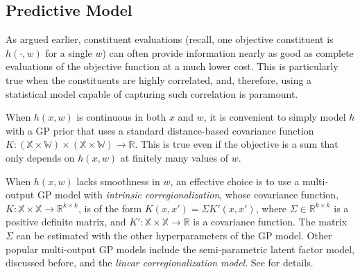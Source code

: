 \documentclass{wscpaperproc}
\newcommand{\R}{\mathbb{R}}
\newcommand{\X}{\mathbb{X}}
\newcommand{\W}{\mathbb{W}}
\theoremstyle{wsc}
\begin{document}

\subsection{Predictive Model}
As argued earlier,  constituent evaluations  (recall, one objective constituent is $h(\cdot,w)$ for a single $w$) can often provide information nearly as good as complete evaluations of the objective function at a much lower cost. This is particularly true when the constituents are highly correlated, and, therefore, using a statistical model capable of capturing such correlation is paramount.

When $h(x,w)$ is continuous in both $x$ and $w$, 
it is convenient to simply model $h$ with  
a GP prior that uses a standard distance-based covariance function $K:(\X\times\W)\times(\X\times\W)\rightarrow\R$. 
This is true even if the objective is a sum that only depends on $h(x,w)$ at finitely many values of $w$.



When $h(x,w)$ lacks smoothness in $w$,  
an effective choice is to use a multi-output GP model with \textit{intrinsic corregionalization}, whose covariance function, $K:\X\times\X \rightarrow \R^{k\times k}$, is of the form $K(x,x') = \Sigma K'(x,x')$, where $\Sigma\in\R^{k\times k}$ is a positive definite  matrix, and $K':\X\times\X\rightarrow\R$ is a covariance function. The matrix $\Sigma$ can be estimated with the other hyperparameters of the GP model. Other popular multi-output GP models include the semi-parametric latent factor model, discussed before, and the \textit{linear corregionalization model}. See  for details.
\end{document}
